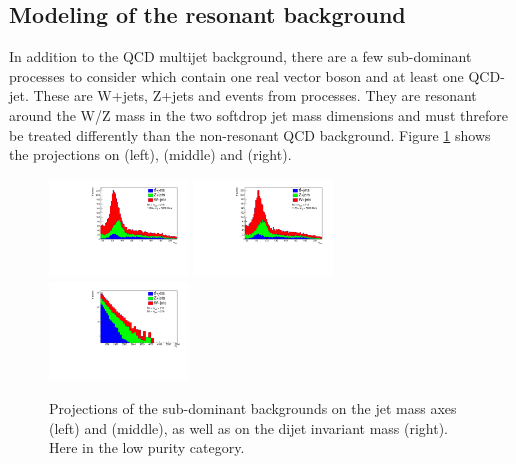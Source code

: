 \clearpage

\subsection{Modeling of the resonant background}
\label{sec:resbkgd}
In addition to the QCD multijet background, there are a few sub-dominant processes to consider which contain one real vector boson and at least one QCD-jet. These are W+jets, Z+jets and events from \ttbar processes. They are resonant around the W/Z mass in the two softdrop jet mass dimensions and must threfore be treated differently than the non-resonant QCD background. Figure \ref{fig:stack_res_bkg} shows the projections on \MJO (left), \MJT (middle) and \MVV (right).
\begin{figure}[h!]
 \includegraphics[width=0.329\textwidth]{figures/analysis/search3/AN-17-303/resonantBkg/CP_background_px_xrange55-215_yrange55-215zrange1126-5000_HPLP.pdf}
 \includegraphics[width=0.329\textwidth]{figures/analysis/search3/AN-17-303/resonantBkg/CP_background_py_xrange55-215_yrange55-215zrange1126-5000_HPLP.pdf}
 \includegraphics[width=0.329\textwidth]{figures/analysis/search3/AN-17-303/resonantBkg/CP_background_pz_xrange55-215_yrange55-215zrange1126-5000_HPLP.pdf}
\caption{Projections of the sub-dominant backgrounds on the jet mass axes \MJO (left) and \MJT (middle), as well as on the dijet invariant mass \MVV (right). Here in the low purity category.}
\label{fig:stack_res_bkg}
\end{figure}
